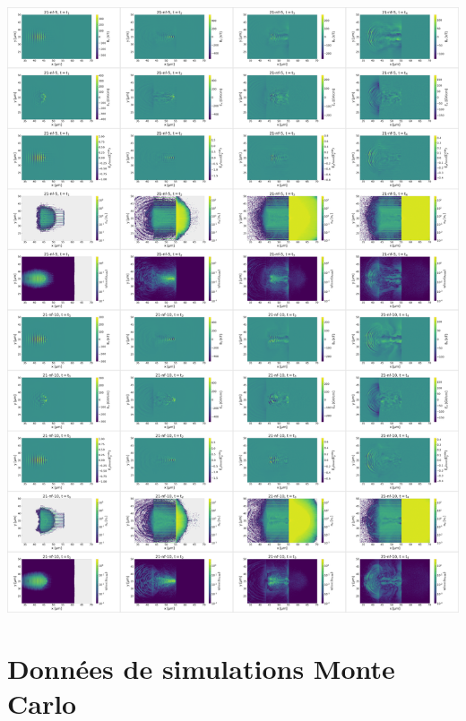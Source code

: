 \hspace{-2cm}\includegraphics[width=1.2\linewidth]{8-annexes/absorber_21_p2.png}

\newpage
\newpage
\section{Données de simulations Monte Carlo}
\label{an:6-MC}

